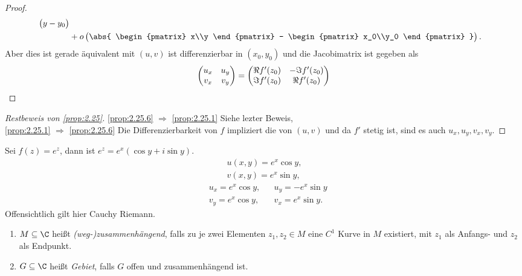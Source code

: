 \begin{proof}
\begin{align*}
\begin{pmatrix}
y-y_0
\end{pmatrix}
\\ &+
o
\begin{pmatrix}
\abs{
\begin{pmatrix}
x\\y
\end{pmatrix}
-
\begin{pmatrix}
x_0\\y_0
\end{pmatrix}
}
\end{pmatrix}.
\end{align*}
Aber dies ist gerade äquivalent mit $(u,v)$ ist differenzierbar in $(x_0,y_0)$
und die Jacobimatrix ist gegeben als
\begin{align*}
\begin{pmatrix}
u_x & u_y\\ v_x  & v_y 
\end{pmatrix}
=
\begin{pmatrix}
\Re f'(z_0) & -\Im f'(z_0)\\
\Im f'(z_0) & \Re f'(z_0)
\end{pmatrix}\qedhere
\end{align*}
\end{proof}

\begin{proof}[Restbeweis von \ref{prop:2.25}]
\ref{prop:2.25.6} $\Rightarrow$ \ref{prop:2.25.1} Siehe lezter Beweis,\\
\ref{prop:2.25.1} $\Rightarrow$ \ref{prop:2.25.6} Die Differenzierbarkeit von
$f$ impliziert die von $(u,v)$ und da $f'$ stetig ist, sind es auch
$u_x,u_y,v_x,v_y$.\qedhere
\end{proof}

\begin{bsp}
\label{bsp:2.45}
Sei $f(z) = e^z$, dann ist $e^z = e^x(\cos y + i\sin y)$.
\begin{align*}
u(x,y) = e^x\cos y,\\
v(x,y) = e^x\sin y,
\end{align*}
\begin{align*}
&u_x = e^x\cos y,&&u_y = -e^x\sin y\\
&v_y = e^x\cos y, && v_x = e^x\sin y.
\end{align*}
Offensichtlich gilt hier Cauchy Riemann.\bsphere
\end{bsp}

\begin{defn}
\label{defn:2.46}
\begin{enumerate}
  \item $M\subseteq\C$ heißt \emph{(weg-)zusammenhängend}, falls zu je zwei
  Elementen $z_1,z_2\in M$ eine $C^1$ Kurve in $M$ existiert, mit $z_1$ als Anfangs- und
  $z_2$ als Endpunkt.
  \item $G\subseteq\C$ heißt \emph{Gebiet}, falls $G$ offen und
  zusammenhängend ist.\fishhere
\end{enumerate}
\end{defn}

